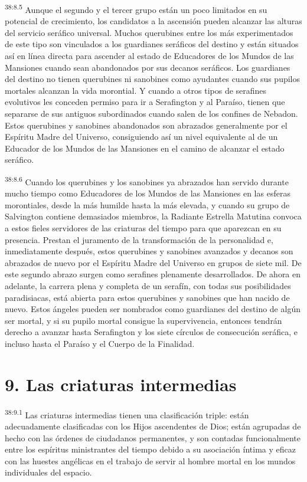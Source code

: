 \par
\textsuperscript{38:8.5} Aunque el segundo y el tercer grupo están un poco limitados en su potencial de crecimiento, los candidatos a la ascensión pueden alcanzar las alturas del servicio seráfico universal. Muchos querubines entre los más experimentados de este tipo son vinculados a los guardianes seráficos del destino y están situados así en línea directa para ascender al estado de Educadores de los Mundos de las Mansiones cuando sean abandonados por sus decanos seráficos. Los guardianes del destino no tienen querubines ni sanobines como ayudantes cuando sus pupilos mortales alcanzan la vida morontial. Y cuando a otros tipos de serafines evolutivos les conceden permiso para ir a Serafington y al Paraíso, tienen que separarse de sus antiguos subordinados cuando salen de los confines de Nebadon. Estos querubines y sanobines abandonados son abrazados generalmente por el Espíritu Madre del Universo, consiguiendo así un nivel equivalente al de un Educador de los Mundos de las Mansiones en el camino de alcanzar el estado seráfico.

\par
\textsuperscript{38:8.6} Cuando los querubines y los sanobines ya abrazados han servido durante mucho tiempo como Educadores de los Mundos de las Mansiones en las esferas morontiales, desde la más humilde hasta la más elevada, y cuando su grupo de Salvington contiene demasiados miembros, la Radiante Estrella Matutina convoca a estos fieles servidores de las criaturas del tiempo para que aparezcan en su presencia. Prestan el juramento de la transformación de la personalidad e, inmediatamente después, estos querubines y sanobines avanzados y decanos son abrazados de nuevo por el Espíritu Madre del Universo en grupos de siete mil. De este segundo abrazo surgen como serafines plenamente desarrollados. De ahora en adelante, la carrera plena y completa de un serafín, con todas sus posibilidades paradisiacas, está abierta para estos querubines y sanobines que han nacido de nuevo. Estos ángeles pueden ser nombrados como guardianes del destino de algún ser mortal, y si su pupilo mortal consigue la supervivencia, entonces tendrán derecho a avanzar hasta Serafington y los siete círculos de consecución seráfica, e incluso hasta el Paraíso y el Cuerpo de la Finalidad.

\section*{9. Las criaturas intermedias}
\par
\textsuperscript{38:9.1} Las criaturas intermedias tienen una clasificación triple: están adecuadamente clasificadas con los Hijos ascendentes de Dios; están agrupadas de hecho con las órdenes de ciudadanos permanentes, y son contadas funcionalmente entre los espíritus ministrantes del tiempo debido a su asociación íntima y eficaz con las huestes angélicas en el trabajo de servir al hombre mortal en los mundos individuales del espacio.

